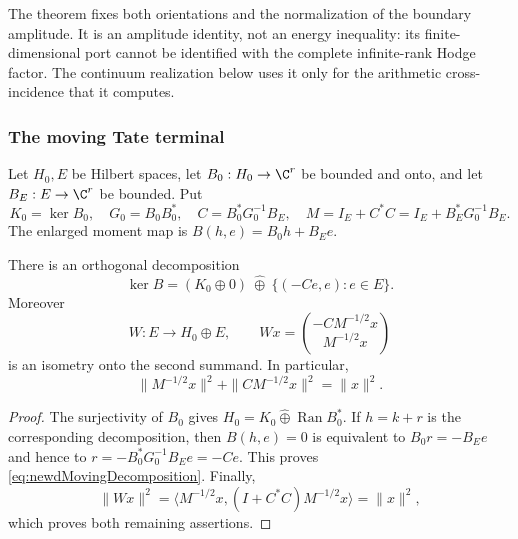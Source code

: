 The theorem fixes both orientations and the normalization of the boundary
amplitude.  It is an amplitude identity, not an energy inequality: its
finite-dimensional port cannot be identified with the complete
infinite-rank Hodge factor.  The continuum realization below uses it only
for the arithmetic cross-incidence that it computes.

\subsubsection{The moving Tate terminal}

Let $H_0,E$ be Hilbert spaces, let $B_0:H_0\to\C^r$ be bounded and onto,
and let $B_E:E\to\C^r$ be bounded.  Put
\begin{equation}\label{eq:newdMovingData}
 K_0=\ker B_0,
 \quad G_0=B_0B_0^*,
 \quad C=B_0^*G_0^{-1}B_E,
 \quad M=I_E+C^*C=I_E+B_E^*G_0^{-1}B_E.
\end{equation}
The enlarged moment map is $B(h,e)=B_0h+B_Ee$.

\begin{theorem}
\label{thm:newdMovingConstraint}
There is an orthogonal decomposition
\begin{equation}\label{eq:newdMovingDecomposition}
 \ker B=(K_0\oplus0)\ \widehat\oplus\
          \{(-Ce,e):e\in E\}.
\end{equation}
Moreover
\begin{equation}\label{eq:newdMovingIsometry}
 W:E\longrightarrow H_0\oplus E,
 \qquad
 Wx=\binom{-CM^{-1/2}x}{M^{-1/2}x}
\end{equation}
is an isometry onto the second summand.  In particular,
\begin{equation}\label{eq:newdMovingConservation}
 \|M^{-1/2}x\|^2+\|CM^{-1/2}x\|^2=\|x\|^2.
\end{equation}
\end{theorem}

\begin{proof}
The surjectivity of $B_0$ gives
$H_0=K_0\widehat\oplus\operatorname{Ran} B_0^*$.  If $h=k+r$ is the corresponding
decomposition, then $B(h,e)=0$ is equivalent to $B_0r=-B_Ee$ and hence to
$r=-B_0^*G_0^{-1}B_Ee=-Ce$.  This proves
\eqref{eq:newdMovingDecomposition}.  Finally,
\[
 \|Wx\|^2
 =\langle M^{-1/2}x,(I+C^*C)M^{-1/2}x\rangle=\|x\|^2,
\]
which proves both remaining assertions.
\end{proof}

